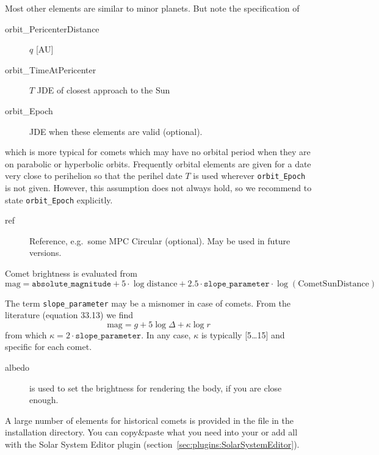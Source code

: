 Most other elements are similar to minor planets. But note the specification of
\begin{description}
\item[orbit\_PericenterDistance] $q$ [AU]
\item[orbit\_TimeAtPericenter] $T$  JDE of closest approach to the Sun
\item[orbit\_Epoch] JDE when these elements are valid (optional).
\end{description}
which is more typical for comets which may have no orbital period when
they are on parabolic or hyperbolic orbits. Frequently orbital
elements are given for a date very close to perihelion so that the
perihel date $T$ is used wherever 
\texttt{orbit\_Epoch} is not given. However, this assumption does not always hold,
so we recommend to state \texttt{orbit\_Epoch} explicitly.

\begin{description}
\item[ref] Reference, e.g.\ some MPC Circular (optional).  May be used in future versions.
\end{description}

Comet brightness is evaluated from
\begin{equation}
  \label{eq:comet_magnitudes}
  \mathrm{mag}=\mathtt{absolute\_magnitude}+5\cdot\log{\mathrm{distance}} + 2.5\cdot\mathtt{slope\_parameter}\cdot\log(\mathrm{CometSunDistance})
\end{equation}

The term \texttt{slope\_parameter} may be a misnomer in case of
comets. From the literature \citep{AstronomicalAlgorithms:1998} (equation 33.13) we find
\begin{equation}
  \label{eq:comet_magnitudes_Meeus}
  \mathrm{mag}=g+5\log\Delta + \kappa\log r
\end{equation}
from which $\kappa=2\cdot\mathtt{slope\_parameter}$. In any case, $\kappa$ is typically [5\ldots15] and specific for each comet.

\begin{description}
\item[albedo] is used to set the brightness for rendering the body,
if you are close enough. 
\end{description}

A large number of elements for historical comets is provided in the
file  in the installation directory. You
can copy\&paste what you need into your
 or add all with the Solar System Editor plugin (section~\ref{sec:plugins:SolarSystemEditor}). 


